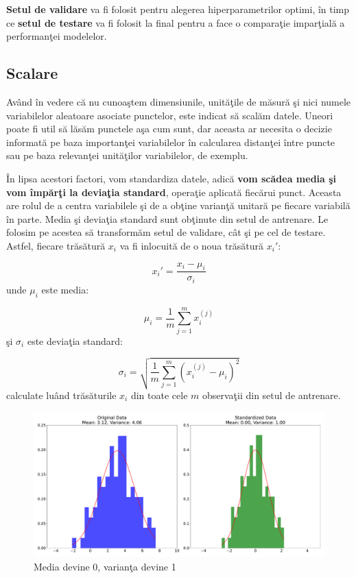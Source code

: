 \textbf{Setul de validare} va fi folosit pentru alegerea hiperparametrilor optimi, în timp ce 
\textbf{setul de testare} va fi folosit la final pentru a face o comparaţie imparţială 
a performanţei modelelor.

\subsection{Scalare}

Având în vedere că nu cunoaştem dimensiunile, unităţile de măsură şi nici 
numele variabilelor aleatoare asociate punctelor, este indicat să scalăm 
datele. Uneori poate fi util să lăsăm punctele aşa cum sunt, dar aceasta ar necesita 
o decizie informată pe baza importanţei variabilelor în calcularea 
distanţei între puncte sau pe baza 
relevanţei unităţilor variabilelor, de exemplu. 

În lipsa acestori factori, vom standardiza datele, adică  
\textbf{vom scădea media şi vom împărţi la deviaţia standard}, operaţie aplicată 
fiecărui punct. Aceasta are rolul de a centra variabilele şi de a obţine varianţă
unitară pe fiecare variabilă în parte. 
Media şi deviaţia standard sunt obţinute din setul de antrenare. Le folosim pe acestea 
să transformăm setul de validare, cât şi pe cel de testare. Astfel, fiecare trăsătură 
$x_{i}$ va fi inlocuită de o noua trăsătură $x_{i}'$:

$$x_{i}' = \frac{x_{i} - \mu_{i}}{\sigma_{i}}$$
unde $\mu_{i}$ este media: 

$$\mu_{i} = \frac{1}{m} \sum_{j=1}^{m} x_{i}^{(j)}$$
şi $\sigma_{i}$ este deviaţia standard: 

$$\sigma_{i} = \sqrt{ \frac{1}{m} \sum_{j=1}^{m} (x_{i}^{(j)} - \mu_{i}) ^ 2 }$$ 
calculate luând trăsăturile $x_{i}$ din toate cele $m$ observaţii din setul de antrenare.

\begin{figure}[H]
    \centering
    \includegraphics[width=\linewidth]{images/standardiaztion.pdf}
    \caption{Media devine 0, varianţa devine 1}
\end{figure}